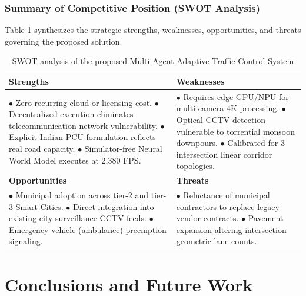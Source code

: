 \documentclass[12pt,a4paper,oneside]{report}
\begin{document}
\subsection{Summary of Competitive Position (SWOT Analysis)}
Table \ref{tab:ch5_swot} synthesizes the strategic strengths, weaknesses, opportunities, and threats governing the proposed solution.

\begin{table}[htbp]
\centering
\small
\caption{SWOT analysis of the proposed Multi-Agent Adaptive Traffic Control System}
\label{tab:ch5_swot}
\begin{tabularx}{\textwidth}{|X|X|}
\hline
\textbf{Strengths} & \textbf{Weaknesses} \\ \hline
$\bullet$ Zero recurring cloud or licensing cost. \newline
$\bullet$ Decentralized execution eliminates telecommunication network vulnerability. \newline
$\bullet$ Explicit Indian PCU formulation reflects real road capacity. \newline
$\bullet$ Simulator-free Neural World Model executes at 2,380 FPS. & 
$\bullet$ Requires edge GPU/NPU for multi-camera 4K processing. \newline
$\bullet$ Optical CCTV detection vulnerable to torrential monsoon downpours. \newline
$\bullet$ Calibrated for 3-intersection linear corridor topologies. \\ \hline
\textbf{Opportunities} & \textbf{Threats} \\ \hline
$\bullet$ Municipal adoption across tier-2 and tier-3 Smart Cities. \newline
$\bullet$ Direct integration into existing city surveillance CCTV feeds. \newline
$\bullet$ Emergency vehicle (ambulance) preemption signaling. & 
$\bullet$ Reluctance of municipal contractors to replace legacy vendor contracts. \newline
$\bullet$ Pavement expansion altering intersection geometric lane counts. \\ \hline
\end{tabularx}
\end{table}

\chapter{Conclusions and Future Work}
\label{ch:conclusion}
\end{document}
